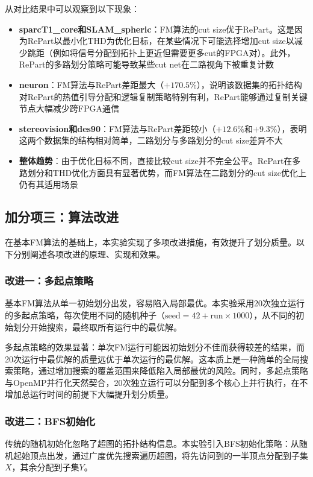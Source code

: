 \documentclass{SYSUReport}
\begin{document}
从对比结果中可以观察到以下现象：

\begin{itemize}
\item \textbf{sparcT1\_core和SLAM\_spheric}：FM算法的cut size优于RePart。这是因为RePart以最小化THD为优化目标，在某些情况下可能选择增加cut size以减少跳距（例如将信号分配到拓扑上更近但需要更多cut的FPGA对）。此外，RePart的多路划分策略可能导致某些cut net在二路视角下被重复计数
\item \textbf{neuron}：FM算法与RePart差距最大（$+170.5\%$），说明该数据集的拓扑结构对RePart的热值引导分配和逻辑复制策略特别有利，RePart能够通过复制关键节点大幅减少跨FPGA通信
\item \textbf{stereovision和des90}：FM算法与RePart差距较小（$+12.6\%$和$+9.3\%$），表明这两个数据集的结构相对简单，二路划分与多路划分的cut size差异不大
\item \textbf{整体趋势}：由于优化目标不同，直接比较cut size并不完全公平。RePart在多路划分和THD优化方面具有显著优势，而FM算法在二路划分的cut size优化上仍有其适用场景
\end{itemize}

\subsection{加分项三：算法改进}

在基本FM算法的基础上，本实验实现了多项改进措施，有效提升了划分质量。以下分别阐述各项改进的原理、实现和效果。

\subsubsection{改进一：多起点策略}
基本FM算法从单一初始划分出发，容易陷入局部最优。本实验采用20次独立运行的多起点策略，每次使用不同的随机种子（$\text{seed} = 42 + \text{run} \times 1000$），从不同的初始划分开始搜索，最终取所有运行中的最优解。

多起点策略的效果显著：单次FM运行可能因初始划分不佳而获得较差的结果，而20次运行中最优解的质量远优于单次运行的最优解。这本质上是一种简单的全局搜索策略，通过增加搜索的覆盖范围来降低陷入局部最优的风险。同时，多起点策略与OpenMP并行化天然契合，20次独立运行可以分配到多个核心上并行执行，在不增加总运行时间的前提下大幅提升划分质量。

\subsubsection{改进二：BFS初始化}
传统的随机初始化忽略了超图的拓扑结构信息。本实验引入BFS初始化策略：从随机起始顶点出发，通过广度优先搜索遍历超图，将先访问到的一半顶点分配到子集$X$，其余分配到子集$Y$。
\end{document}
